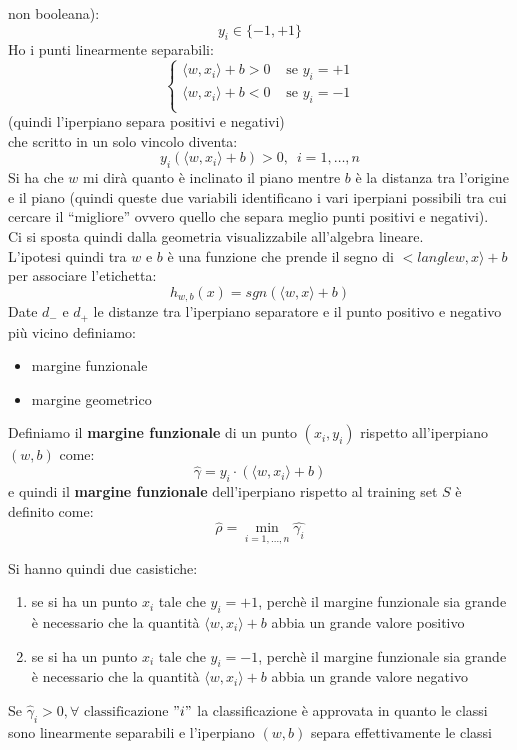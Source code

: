 non booleana):
\[y_i\in\{-1,+1\}\]
Ho i punti linearmente separabili:
\[
  \begin{cases}
    \langle w,x_i\rangle + b >0 &\mbox{ se }y_i=+1\\
    \langle w,x_i\rangle + b <0 &\mbox{ se }y_i=-1\\
  \end{cases}
\](quindi l'iperpiano separa positivi e negativi)\\
che scritto in un solo vincolo diventa:
\[y_i(\langle w,x_i\rangle + b )>0,\,\,\,i=1,\ldots, n\]
Si ha che $w$ mi dirà quanto è inclinato il piano mentre $b$ è la distanza tra
l'origine e il piano (quindi queste due variabili identificano i vari iperpiani
possibili tra cui cercare il ``migliore'' ovvero quello che separa meglio punti
positivi e negativi).\\
Ci si sposta quindi dalla geometria visualizzabile all'algebra lineare.\\
L'ipotesi quindi tra $w$ e $b$ è una funzione che prende il segno di $<langle
w,x\rangle+b$ per associare l'etichetta:
\[h_{w,b}(x)=sgn(\langle w,x\rangle+b)\]
Date $d_-$ e $d_+$ le distanze tra l’iperpiano separatore e il punto positivo e
negativo più vicino definiamo:
\begin{itemize}
  \item margine funzionale
  \item margine geometrico
\end{itemize}
\begin{definizione}
  Definiamo il \textbf{margine funzionale} di un punto $(x_i,y_i)$ rispetto
  all'iperpiano $(w,b)$ come:
  \[\hat{\gamma}=y_i\cdot(\langle w,x_i\rangle+b)\]
  e quindi il \textbf{margine funzionale} dell'iperpiano rispetto al training
  set $S$ è definito come:
  \[\hat{\rho}=\min_{i=1,\ldots,n}\hat{\gamma_i}\]
\end{definizione}
Si hanno quindi due casistiche:
\begin{enumerate}
  \item se si ha un punto $x_i$ tale che $y_i=+1$, perchè il margine funzionale
  sia grande è necessario che la quantità
  $\langle w,x_i\rangle+b$ abbia un grande valore positivo
   \item se si ha un punto $x_i$ tale che $y_i=-1$, perchè il margine funzionale
  sia grande è necessario che  la quantità
  $\langle w,x_i\rangle+b$ abbia un grande valore negativo
\end{enumerate}
\begin{teorema}
  Se $\hat{\gamma}_i>0,\forall \mbox{ classificazione}$ $"i"$ la classificazione è
  approvata in quanto le classi sono linearmente separabili e l'iperpiano
  $(w,b)$ separa effettivamente le classi
\end{teorema}
